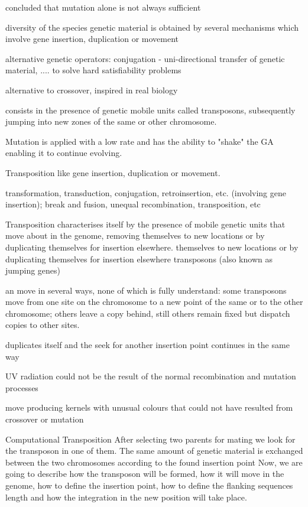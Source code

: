 \documentclass[12pt,portuguese,a4paper]{article}
\begin{document}
concluded that mutation alone is not always sufficient

diversity of the species genetic material is obtained by several mechanisms which involve gene insertion, duplication or movement

alternative genetic operators:
conjugation - uni-directional transfer of genetic material, .... to solve hard satisfiability problems

alternative to crossover, inspired in real biology

consists in the presence of genetic mobile units called transposons, subsequently jumping into new zones of the same or other chromosome.

Mutation is applied with a low rate and has the ability to "shake" the GA enabling it to continue evolving.

 Transposition
like gene insertion, duplication or movement.

transformation, transduction, conjugation, retroinsertion, etc. (involving gene insertion); break and fusion, unequal recombination, transposition, etc


Transposition characterises itself by the presence of mobile genetic units that move about in the genome,
removing themselves to new locations or by duplicating themselves for insertion elsewhere.
themselves to new locations or by duplicating themselves for insertion elsewhere
transposons (also known as jumping genes)


an move in several ways, none of which is fully understand: some transposons move from one site on the chromosome to a new point of the same or to the other chromosome; others leave a copy behind, still others remain fixed but dispatch copies to other sites.

duplicates itself and the seek for another insertion point continues in the same way

UV radiation could not be the result of the normal recombination and mutation processes

move producing kernels with unusual colours that could not have resulted from crossover or mutation


Computational Transposition
After selecting two parents for mating we look for the transposon in one of them.
The same amount of genetic material is exchanged between the two chromosomes according to the found insertion point
Now, we are going to describe how the transposon will be formed, how it will move in the genome, how to define the insertion point, how to define the flanking sequences length and how the integration in the new position will take place.
\end{document}
